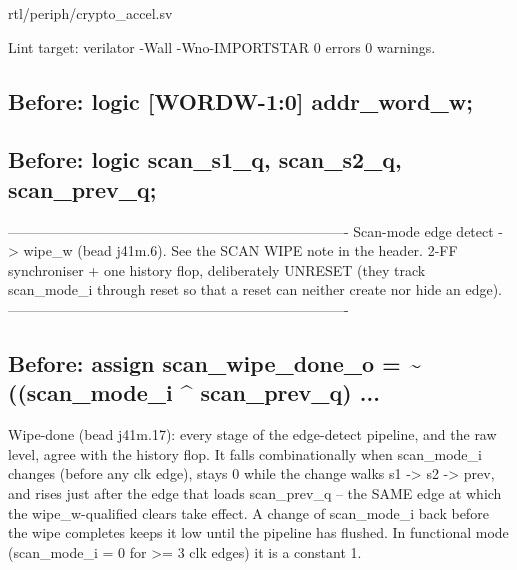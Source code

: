 \begin{relocated}{rtl/periph/crypto_accel.sv}
\begin{textblock}
Lint target: verilator -Wall -Wno-IMPORTSTAR 0 errors 0 warnings.
\end{textblock}

\subsection*{Before: logic [WORDW-1:0] addr\_word\_w;}


\subsection*{Before: logic scan\_s1\_q, scan\_s2\_q, scan\_prev\_q;}

\begin{textblock}
-------------------------------------------------------------------------
Scan-mode edge detect -> wipe_w (bead j41m.6). See the SCAN WIPE note in the header.
2-FF synchroniser + one history flop, deliberately UNRESET (they track scan_mode_i through
reset so that a reset can neither create nor hide an edge).
-------------------------------------------------------------------------
\end{textblock}

\subsection*{Before: assign scan\_wipe\_done\_o = \~{}((scan\_mode\_i \^{} scan\_prev\_q) ...}

\begin{textblock}
Wipe-done (bead j41m.17): every stage of the edge-detect pipeline, and the raw level, agree
with the history flop. It falls combinationally when scan_mode_i changes (before any clk
edge), stays 0 while the change walks s1 -> s2 -> prev, and rises just after the edge that
loads scan_prev_q -- the SAME edge at which the wipe_w-qualified clears take effect. A change
of scan_mode_i back before the wipe completes keeps it low until the pipeline has flushed.
In functional mode (scan_mode_i = 0 for >= 3 clk edges) it is a constant 1.
\end{textblock}


\end{relocated}

